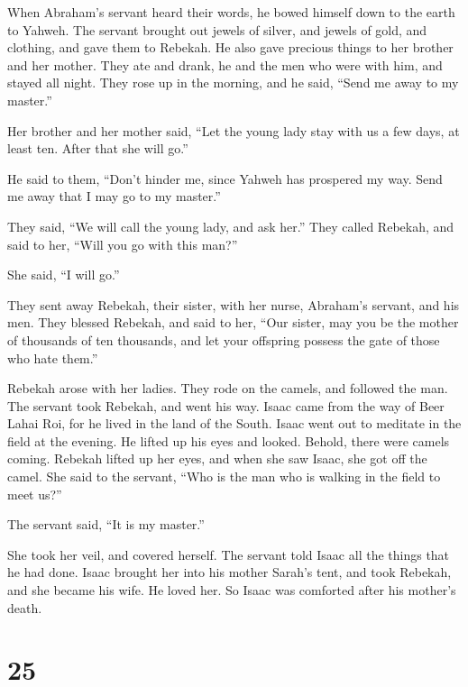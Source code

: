  When Abraham's servant heard their words, he bowed himself
down to the earth to Yahweh.  The servant brought out
jewels of silver, and jewels of gold, and clothing, and gave them to
Rebekah. He also gave precious things to her brother and her mother.
 They ate and drank, he and the men who were with him, and
stayed all night. They rose up in the morning, and he said, ``Send me
away to my master.''

 Her brother and her mother said, ``Let the young lady stay
with us a few days, at least ten. After that she will go.''

 He said to them, ``Don't hinder me, since Yahweh has
prospered my way. Send me away that I may go to my master.''

 They said, ``We will call the young lady, and ask her.''
 They called Rebekah, and said to her, ``Will you go with
this man?''

She said, ``I will go.''

 They sent away Rebekah, their sister, with her nurse,
Abraham's servant, and his men.  They blessed Rebekah, and
said to her, ``Our sister, may you be the mother of thousands of ten
thousands, and let your offspring possess the gate of those who hate
them.''

 Rebekah arose with her ladies. They rode on the camels,
and followed the man. The servant took Rebekah, and went his way.
 Isaac came from the way of Beer Lahai Roi, for he lived in
the land of the South.  Isaac went out to meditate in the
field at the evening. He lifted up his eyes and looked. Behold, there
were camels coming.  Rebekah lifted up her eyes, and when
she saw Isaac, she got off the camel.  She said to the
servant, ``Who is the man who is walking in the field to meet us?''

The servant said, ``It is my master.''

She took her veil, and covered herself.  The servant told
Isaac all the things that he had done.  Isaac brought her
into his mother Sarah's tent, and took Rebekah, and she became his wife.
He loved her. So Isaac was comforted after his mother's death.

\hypertarget{section-24}{%
\section{25}\label{section-24}}


